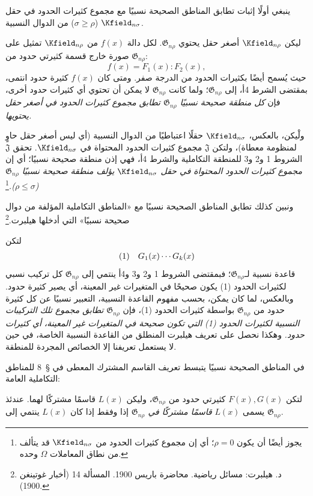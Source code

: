 \documentclass[11pt]{article}
\newcommand{\srcLTR}[1]{\relax\ifmmode\text{\mbox{\babelsublr{\foreignlanguage{english}{#1}}}}\else\babelsublr{\foreignlanguage{english}{#1}}\fi}
\newcommand{\srcfn}[2]{\begingroup\renewcommand{\thefootnote}{\srcLTR{#1}}\footnote{#2}\addtocounter{footnote}{-1}\endgroup}
\providecommand{\Gdom}{\mathfrak{G}}
\begin{document}
ينبغي أولًا إثبات تطابق المناطق الصحيحة نسبيًا مع مجموع كثيرات الحدود في حقل $\Kfield_{n\sigma}$ ($\sigma\ge \rho$) من الدوال النسبية.

ليكن $\Kfield_{n\rho}$ أصغر حقل يحتوي $\Gdom_{n\rho}$. لكل دالة $f(x)$ من $\Kfield_{n\rho}$ تمثيل على صورة خارج قسمة كثيرتي حدود من $\Gdom_{n\rho}$:
\[
f(x)=F_1(x):F_2(x),
\]
حيث يُسمح أيضًا بكثيرات الحدود من الدرجة صفر. ومتى كان $f(x)$ كثيرة حدود انتمى، بمقتضى الشرط 4أ، إلى $\Gdom_{n\rho}$؛ ولما كانت $\Gdom_{n\rho}$ لا يمكن أن تحتوي أي كثيرات حدود أخرى، فإن \emph{كل منطقة صحيحة نسبيًا $\Gdom_{n\rho}$ تطابق مجموع كثيرات الحدود في أصغر حقل يحتويها.}

ولْيكن، بالعكس، $\Kfield_{n\sigma}$ حقلًا اعتباطيًا من الدوال النسبية (أي ليس أصغر حقل حاوٍ لمنظومة معطاة)، ولتكن $\mathfrak J$ مجموع كثيرات الحدود المحتواة في $\Kfield_{n\sigma}$. تحقق $\mathfrak J$ الشروط 1 و2 و3 للمنطقة التكاملية والشرط 4أ، فهي إذن منطقة صحيحة نسبيًا؛ أي إن \emph{مجموع كثيرات الحدود المحتواة في حقل $\Kfield_{n\sigma}$ يؤلف منطقة صحيحة نسبيًا $\Gdom_{n\rho}$ ($\rho\le\sigma$).}\srcfn{*)}{يجوز أيضًا أن يكون $\rho=0$؛ أي إن مجموع كثيرات الحدود من $\Kfield_{n\sigma}$ قد يتألف من نطاق المعاملات $\Omega$ وحده.}

ونبين كذلك تطابق المناطق الصحيحة نسبيًا مع «المناطق التكاملية المؤلفة من دوال صحيحة نسبيًا» التي أدخلها هيلبرت.\srcfn{**)}{د. هيلبرت: مسائل رياضية. محاضرة باريس 1900. المسألة 14 (أخبار غوتينغن 1900).}

لتكن
\[
\begin{array}{@{}l@{\quad}c@{}}
(1)& G_1(x)\cdots G_k(x)
\end{array}
\]
قاعدة نسبية لـ$\Gdom_{n\rho}$؛ فبمقتضى الشروط 1 و2 و3 و4أ ينتمي إلى $\Gdom_{n\rho}$ كل تركيب نسبي لكثيرات الحدود (1) يكون صحيحًا في المتغيرات غير المعينة، أي يصير كثيرة حدود. وبالعكس، لما كان يمكن، بحسب مفهوم القاعدة النسبية، التعبير نسبيًا عن كل كثيرة حدود من $\Gdom_{n\rho}$ بواسطة كثيرات الحدود (1)، فإن $\Gdom_{n\rho}$ \emph{تطابق مجموع تلك التركيبات النسبية لكثيرات الحدود (1) التي تكون صحيحة في المتغيرات غير المعينة، أي كثيرات حدود.} وهكذا نحصل على تعريف هيلبرت المنطلق من القاعدة النسبية الخاصة، في حين لا يستعمل تعريفنا إلا الخصائص المجردة للمنطقة.

في المناطق الصحيحة نسبيًا يتبسط تعريف القاسم المشترك المعطى في \S\ 8 للمناطق التكاملية العامة:

لتكن $F(x),G(x)$ كثيرتي حدود من $\Gdom_{n\rho}$، وليكن $L(x)$ قاسمًا مشتركًا لهما. عندئذ يسمى $L(x)$ \emph{قاسمًا مشتركًا في $\Gdom_{n\rho}$} إذا وفقط إذا كان $L(x)$ ينتمي إلى $\Gdom_{n\rho}$.
\end{document}
